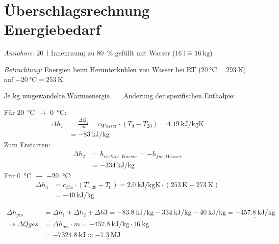 	\section{Überschlagsrechnung Energiebedarf}
		\textit{Annahme}:
		\SI{20}{\litre} Innenraum; zu \SI{80}{\percent} gefüllt mit Wasser (\( \SI{16}{\litre} \widehat{=} \SI{16}{\kilo\gram} \))\par\medskip
		\textit{Betrachtung:}
		Energien beim Herunterkühlen von Wasser bei RT (\( \SI{20}{\celsius} = \SI{293}{\kelvin} \)) auf \( \SI{-20}{\celsius} = \SI{253}{\kelvin} \)\par\bigskip
		\par\bigskip
		\underline{Je kg umgewandelte Wärmeenergie \(=\) Änderung der spezifischen Enthalpie:}\par\medskip
		Für \SI{20}{\celsius} \(\rightarrow\) \SI{0}{\celsius}:
		\begin{align}
			\Delta h_1	&= \frac{\Delta Q_1}{m} = c_{Wasser} \cdot \left(T_0 - T_{20}\right) = \SI{4,19}{\kilo\joule\per\kilo\gram\kelvin}\\%
						&= \SI{-83}{\kilo\joule\per\kilo\gram}
		\end{align}
		Zum Erstarren:
		\begin{align}
			\Delta h_2	&= h_{erstarr,Wasser} = -h_{fus,Wasser} \nonumber \\
						&= \SI{-334}{\kilo\joule\per\kilo\gram}
		\end{align}
		Für \SI{0}{\celsius} \(\rightarrow\) \SI{-20}{\celsius}:
		\begin{align}
			\Delta h_3	&= c_{Eis} \cdot (T_{-20}-T_0) = \SI{2,0}{\kilo\joule\per\kilo\gram\kelvin} \cdot (\SI{253}{\kelvin}-\SI{273}{\kelvin}) \nonumber \\
						&= \SI{-40}{\kilo\joule\per\kilo\gram}
		\end{align}

		\begin{align}
			\Delta h_{ges} 				&= \Delta h_1 + \Delta h_2 + \Delta h3 = \SI{-83,8}{\kilo\joule\per\kilo\gram} - \SI{334}{\kilo\joule\per\kilo\gram} - \SI{40}{\kilo\joule\per\kilo\gram} = \underline{\SI{-457,8}{\kilo\joule\per\kilo\gram}} \nonumber \\
			\Rightarrow \Delta Q{ges} 	&= \Delta h_{ges} \cdot m = \SI{-457,8}{\kilo\joule\per\kilo\gram} \cdot \SI{16}{\kilo\gram} \nonumber \\
										&= \SI{-7324,8}{\kilo\joule} \approx \underline{\underline{\SI{-7,3}{\mega\joule}}}
		\end{align}

